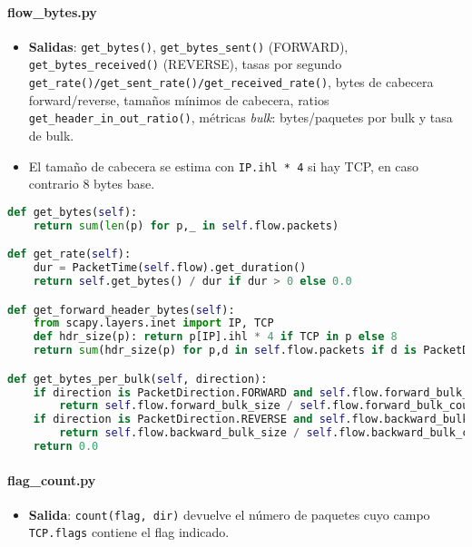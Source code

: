 \paragraph{flow\_bytes.py}

\begin{itemize}
  \item \textbf{Salidas}: \texttt{get\_bytes()}, \texttt{get\_bytes\_sent()} (FORWARD), \texttt{get\_bytes\_received()} (REVERSE), tasas por segundo \texttt{get\_rate()/get\_sent\_rate()/get\_received\_rate()}, bytes de cabecera forward/reverse, tamaños mínimos de cabecera, ratios \texttt{get\_header\_in\_out\_ratio()}, métricas \emph{bulk}: bytes/paquetes por bulk y tasa de bulk.
  \item El tamaño de cabecera se estima con \texttt{IP.ihl * 4} si hay TCP, en caso contrario 8 bytes base.
\end{itemize}

\begin{lstlisting}[language=Python,caption={Bytes y tasas; cabeceras y bulk (extracto)},label=List.FlowBytes]
def get_bytes(self):
    return sum(len(p) for p,_ in self.flow.packets)

def get_rate(self):
    dur = PacketTime(self.flow).get_duration()
    return self.get_bytes() / dur if dur > 0 else 0.0

def get_forward_header_bytes(self):
    from scapy.layers.inet import IP, TCP
    def hdr_size(p): return p[IP].ihl * 4 if TCP in p else 8
    return sum(hdr_size(p) for p,d in self.flow.packets if d is PacketDirection.FORWARD)

def get_bytes_per_bulk(self, direction):
    if direction is PacketDirection.FORWARD and self.flow.forward_bulk_count:
        return self.flow.forward_bulk_size / self.flow.forward_bulk_count
    if direction is PacketDirection.REVERSE and self.flow.backward_bulk_count:
        return self.flow.backward_bulk_size / self.flow.backward_bulk_count
    return 0.0
\end{lstlisting}

\paragraph{flag\_count.py}

\begin{itemize}
  \item \textbf{Salida}: \texttt{count(flag, dir)} devuelve el número de paquetes cuyo campo \texttt{TCP.flags} contiene el flag indicado.
\end{itemize}

